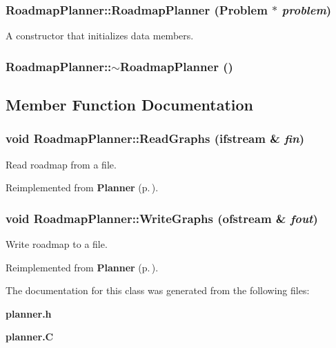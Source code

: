 \subsubsection{\setlength{\rightskip}{0pt plus 5cm}Roadmap\-Planner::Roadmap\-Planner ({\bf Problem} $\ast$ {\em problem})}\label{classRoadmapPlanner_a0}


A constructor that initializes data members.

\subsubsection{\setlength{\rightskip}{0pt plus 5cm}Roadmap\-Planner::$\sim$Roadmap\-Planner ()\hspace{0.3cm}{\tt  [inline]}}\label{classRoadmapPlanner_a1}




\subsection{Member Function Documentation}
\subsubsection{\setlength{\rightskip}{0pt plus 5cm}void Roadmap\-Planner::Read\-Graphs (ifstream \& {\em fin})\hspace{0.3cm}{\tt  [virtual]}}\label{classRoadmapPlanner_a3}


Read roadmap from a file.



Reimplemented from {\bf Planner} {\rm (p.\,\pageref{classPlanner_a6})}.
\subsubsection{\setlength{\rightskip}{0pt plus 5cm}void Roadmap\-Planner::Write\-Graphs (ofstream \& {\em fout})\hspace{0.3cm}{\tt  [virtual]}}\label{classRoadmapPlanner_a2}


Write roadmap to a file.



Reimplemented from {\bf Planner} {\rm (p.\,\pageref{classPlanner_a5})}.

The documentation for this class was generated from the following files:\begin{CompactItemize}
\item 
{\bf planner.h}\item 
{\bf planner.C}\end{CompactItemize}

